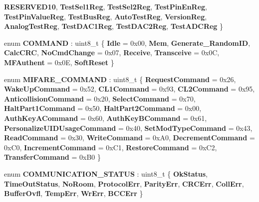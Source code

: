 \begin{DoxyCompactItemize}
{\bfseries R\+E\+S\+E\+R\+V\+E\+D10}, 
{\bfseries Test\+Sel1\+Reg}, 
{\bfseries Test\+Sel2\+Reg}, 
{\bfseries Test\+Pin\+En\+Reg}, 
\newline
{\bfseries Test\+Pin\+Value\+Reg}, 
{\bfseries Test\+Bus\+Reg}, 
{\bfseries Auto\+Test\+Reg}, 
{\bfseries Version\+Reg}, 
\newline
{\bfseries Analog\+Test\+Reg}, 
{\bfseries Test\+D\+A\+C1\+Reg}, 
{\bfseries Test\+D\+A\+C2\+Reg}, 
{\bfseries Test\+A\+D\+C\+Reg}
 \}
\item 
\mbox{\label{class_m_f_r_c522_abf038692c9cf33ed59b44a612e6ed1c7}} 
enum {\bfseries C\+O\+M\+M\+A\+ND} \+: uint8\+\_\+t \{ \newline
{\bfseries Idle} = 0x00, 
{\bfseries Mem}, 
{\bfseries Generate\+\_\+\+Random\+ID}, 
{\bfseries Calc\+C\+RC}, 
\newline
{\bfseries No\+Cmd\+Change} = 0x07, 
{\bfseries Receive}, 
{\bfseries Transceive} = 0x0C, 
{\bfseries M\+F\+Authent} = 0x0E, 
\newline
{\bfseries Soft\+Reset}
 \}
\item 
\mbox{\label{class_m_f_r_c522_a79bd44224bb1ad85e28a0937a6715818}} 
enum {\bfseries M\+I\+F\+A\+R\+E\+\_\+\+C\+O\+M\+M\+A\+ND} \+: uint8\+\_\+t \{ \newline
{\bfseries Request\+Command} = 0x26, 
{\bfseries Wake\+Up\+Command} = 0x52, 
{\bfseries C\+L1\+Command} = 0x93, 
{\bfseries C\+L2\+Command} = 0x95, 
\newline
{\bfseries Anticollision\+Command} = 0x20, 
{\bfseries Select\+Command} = 0x70, 
{\bfseries Halt\+Part1\+Command} = 0x50, 
{\bfseries Halt\+Part2\+Command} = 0x00, 
\newline
{\bfseries Auth\+Key\+A\+Command} = 0x60, 
{\bfseries Auth\+Key\+B\+Command} = 0x61, 
{\bfseries Personalize\+U\+I\+D\+Usage\+Command} = 0x40, 
{\bfseries Set\+Mod\+Type\+Command} = 0x43, 
\newline
{\bfseries Read\+Command} = 0x30, 
{\bfseries Write\+Command} = 0x\+A0, 
{\bfseries Decrement\+Command} = 0x\+C0, 
{\bfseries Increment\+Command} = 0x\+C1, 
\newline
{\bfseries Restore\+Command} = 0x\+C2, 
{\bfseries Transfer\+Command} = 0x\+B0
 \}
\item 
\mbox{\label{class_m_f_r_c522_a1160642f3b2b60b5ea7309374a8d760a}} 
enum {\bfseries C\+O\+M\+M\+U\+N\+I\+C\+A\+T\+I\+O\+N\+\_\+\+S\+T\+A\+T\+US} \+: uint8\+\_\+t \{ \newline
{\bfseries Ok\+Status}, 
{\bfseries Time\+Out\+Status}, 
{\bfseries No\+Room}, 
{\bfseries Protocol\+Err}, 
\newline
{\bfseries Parity\+Err}, 
{\bfseries C\+R\+C\+Err}, 
{\bfseries Coll\+Err}, 
{\bfseries Buffer\+Ovfl}, 
\newline
{\bfseries Temp\+Err}, 
{\bfseries Wr\+Err}, 
{\bfseries B\+C\+C\+Err}
 \}
\end{DoxyCompactItemize}
